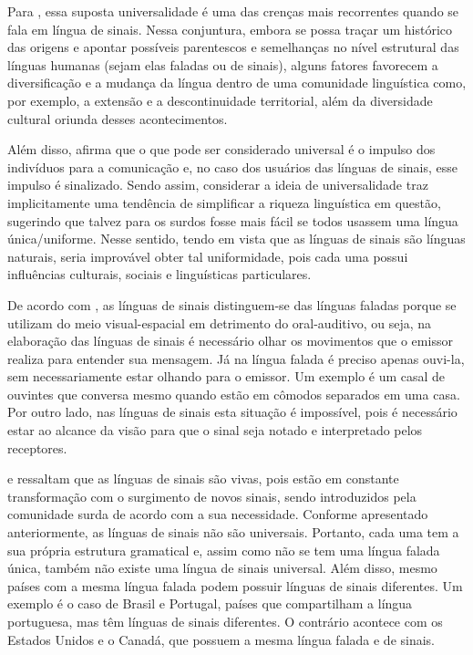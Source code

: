Para , essa suposta universalidade é uma das crenças mais recorrentes quando se fala em língua de sinais. Nessa conjuntura, embora se possa traçar um histórico das origens e apontar possíveis parentescos e semelhanças no nível estrutural das línguas humanas (sejam elas faladas ou de sinais), alguns fatores favorecem a diversificação e a mudança da língua dentro de uma comunidade linguística como, por exemplo, a extensão e a descontinuidade territorial, além da diversidade cultural oriunda desses acontecimentos.

Além disso,  afirma que o que pode ser considerado universal é o impulso dos indivíduos para a comunicação e, no caso dos usuários das línguas de sinais, esse impulso é sinalizado. Sendo assim, considerar a ideia de universalidade traz implicitamente uma tendência de simplificar a riqueza linguística em questão, sugerindo que talvez para os surdos fosse mais fácil se todos usassem uma língua única/uniforme. Nesse sentido, tendo em vista que as línguas de sinais são línguas naturais, seria improvável obter tal uniformidade, pois cada uma possui influências culturais, sociais e linguísticas particulares. %

De acordo com , as línguas de sinais distinguem-se das línguas faladas porque se utilizam do meio visual-espacial em detrimento do oral-auditivo, ou seja, na elaboração das línguas de sinais é necessário olhar os movimentos que o emissor realiza para entender sua mensagem. Já na língua falada é preciso apenas ouvi-la, sem necessariamente estar olhando para o emissor. Um exemplo é um casal de ouvintes que conversa mesmo quando estão em cômodos separados em uma casa. Por outro lado, nas línguas de sinais esta situação é impossível, pois é necessário estar ao alcance da visão para que o sinal seja notado e interpretado pelos receptores.

 e  ressaltam que as línguas de sinais são vivas, pois estão em constante transformação com o surgimento de novos sinais, sendo introduzidos pela comunidade surda de acordo com a sua necessidade. Conforme apresentado anteriormente, as línguas de sinais não são universais. Portanto, cada uma tem a sua própria estrutura gramatical e, assim como não se tem uma língua falada única, também não existe uma língua de sinais universal. Além disso, mesmo países com a mesma língua falada podem possuir línguas de sinais diferentes. Um exemplo é o caso de Brasil e Portugal, países que compartilham a língua portuguesa, mas têm línguas de sinais diferentes. O contrário acontece com os Estados Unidos e o Canadá, que possuem a mesma língua falada e de sinais.

